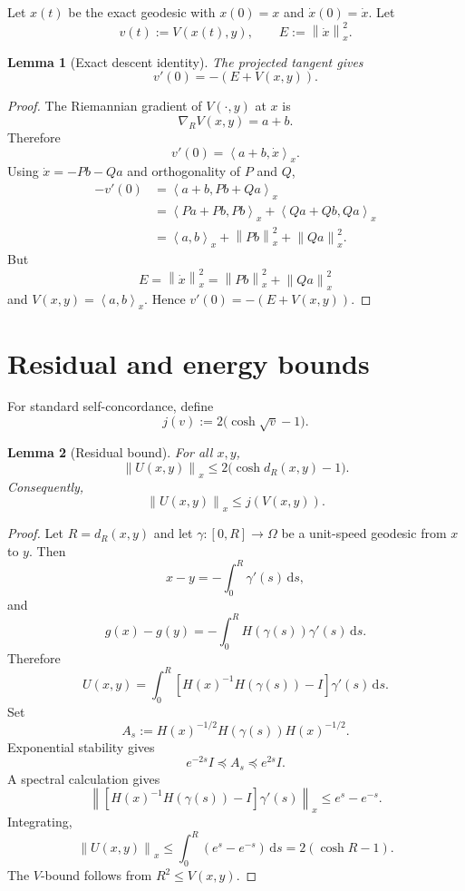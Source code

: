 \documentclass[11pt]{article}
\newtheorem{lemma}{Lemma}
\newcommand{\ip}[2]{\left\langle #1,#2\right\rangle}
\newcommand{\norm}[1]{\left\lVert #1\right\rVert}
\newcommand{\dd}{\mathrm d}
\begin{document}
Let $x(t)$ be the exact geodesic with $x(0)=x$ and $\dot x(0)=\dot x$. Let
\[
    v(t):=V(x(t),y),
    \qquad
    E:=\norm{\dot x}_x^2.
\]

\begin{lemma}[Exact descent identity]
The projected tangent gives
\[
    v'(0)=-(E+V(x,y)).
\]
\end{lemma}

\begin{proof}
The Riemannian gradient of $V(\cdot,y)$ at $x$ is
\[
    \nabla_R V(x,y)=a+b.
\]
Therefore
\[
    v'(0)=\ip{a+b}{\dot x}_x.
\]
Using $\dot x=-Pb-Qa$ and orthogonality of $P$ and $Q$,
\[
\begin{aligned}
    -v'(0)
    &=\ip{a+b}{Pb+Qa}_x  \\
    &=\ip{Pa+Pb}{Pb}_x+\ip{Qa+Qb}{Qa}_x \\
    &=\ip{a}{b}_x+\norm{Pb}_x^2+\norm{Qa}_x^2.
\end{aligned}
\]
But
\[
    E=\norm{\dot x}_x^2=\norm{Pb}_x^2+\norm{Qa}_x^2
\]
and $V(x,y)=\ip{a}{b}_x$. Hence $v'(0)=-(E+V(x,y))$.
\end{proof}

\section{Residual and energy bounds}

For standard self-concordance, define
\[
    j(v):=2\bigl(\cosh\sqrt v-1\bigr).
\]

\begin{lemma}[Residual bound]
For all $x,y$,
\[
    \norm{U(x,y)}_x
    \le
    2\bigl(\cosh d_R(x,y)-1\bigr).
\]
Consequently,
\[
    \norm{U(x,y)}_x\le j(V(x,y)).
\]
\end{lemma}

\begin{proof}
Let $R=d_R(x,y)$ and let $\gamma:[0,R]\to\Omega$ be a unit-speed geodesic from $x$ to $y$. Then
\[
    x-y=-\int_0^R\gamma'(s)\,\dd s,
\]
and
\[
    g(x)-g(y)=-\int_0^R H(\gamma(s))\gamma'(s)\,\dd s.
\]
Therefore
\[
    U(x,y)=\int_0^R\left[H(x)^{-1}H(\gamma(s))-I\right]\gamma'(s)\,\dd s.
\]
Set
\[
    A_s:=H(x)^{-1/2}H(\gamma(s))H(x)^{-1/2}.
\]
Exponential stability gives
\[
    e^{-2s}I\preceq A_s\preceq e^{2s}I.
\]
A spectral calculation gives
\[
    \left\|\left[H(x)^{-1}H(\gamma(s))-I\right]\gamma'(s)\right\|_x
    \le
    e^s-e^{-s}.
\]
Integrating,
\[
    \norm{U(x,y)}_x
    \le
    \int_0^R(e^s-e^{-s})\,\dd s
    =2(\cosh R-1).
\]
The $V$-bound follows from $R^2\le V(x,y)$.
\end{proof}
\end{document}
